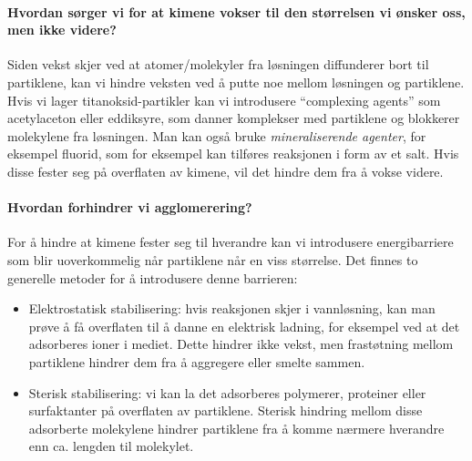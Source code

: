 \paragraph{Hvordan sørger vi for at kimene vokser til den størrelsen vi ønsker oss, men ikke videre?} Siden vekst skjer ved at atomer/molekyler fra løsningen diffunderer bort til partiklene, kan vi hindre veksten ved å putte noe mellom løsningen og partiklene. Hvis vi lager titanoksid-partikler kan vi introdusere ``complexing agents'' som acetylaceton eller eddiksyre, som danner komplekser med partiklene og blokkerer molekylene fra løsningen. Man kan også bruke \emph{mineraliserende agenter}, for eksempel fluorid, som for eksempel kan tilføres reaksjonen i form av et salt. Hvis disse fester seg på overflaten av kimene, vil det hindre dem fra å vokse videre.

\paragraph{Hvordan forhindrer vi agglomerering?} For å hindre at kimene fester seg til hverandre kan vi introdusere energibarriere som blir uoverkommelig når partiklene når en viss størrelse. Det finnes to generelle metoder for å introdusere denne barrieren:
\begin{itemize}
	\item Elektrostatisk stabilisering: hvis reaksjonen skjer i vannløsning, kan man prøve å få overflaten til å danne en elektrisk ladning, for eksempel ved at det adsorberes ioner i mediet. Dette hindrer ikke vekst, men frastøtning mellom partiklene hindrer dem fra å aggregere eller smelte sammen. 
	\item Sterisk stabilisering: vi kan la det adsorberes polymerer, proteiner eller surfaktanter på overflaten av partiklene. Sterisk hindring mellom disse adsorberte molekylene hindrer partiklene fra å komme nærmere hverandre enn ca. lengden til molekylet.
\end{itemize}
